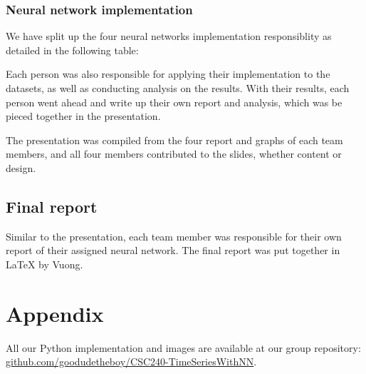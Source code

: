 \documentclass[letterpaper, 10 pt, conference]{ieeeconf}  %
\begin{document}
        \subsubsection{Neural network implementation} We have split up the four neural networks implementation responsiblity as detailed in the following table:
            \begin{table}[h!] \centering
                \caption{Network and their implementer}
                \begin{threeparttable}
                \end{threeparttable}
            \end{table}

        Each person was also responsible for applying their implementation to the datasets, as well as conducting analysis on the results. With their results, each person went ahead and write up their own report and analysis, which was be pieced together in the presentation.

        The presentation was compiled from the four report and graphs of each team members, and all four members contributed to the slides, whether content or design.

    \subsection{Final report}
        Similar to the presentation, each team member was responsible for their own report of their assigned neural network. The final report was put together in LaTeX by Vuong.

\section{Appendix}
    All our Python implementation and images are available at our group repository: \url{github.com/goodudetheboy/CSC240-TimeSeriesWithNN}.



\end{document}
